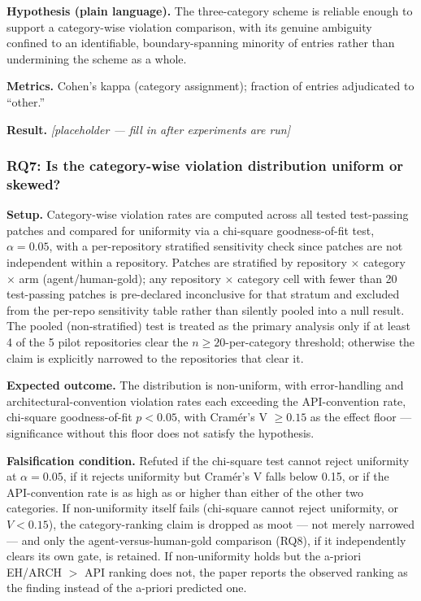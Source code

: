 \documentclass[11pt]{article}
\newcommand{\ph}{\textit{[placeholder --- fill in after experiments are run]}}
\begin{document}
\textbf{Hypothesis (plain language).} The three-category scheme is reliable enough to support a category-wise violation comparison, with its genuine ambiguity confined to an identifiable, boundary-spanning minority of entries rather than undermining the scheme as a whole.

\textbf{Metrics.} Cohen's kappa (category assignment); fraction of entries adjudicated to ``other.''

\textbf{Result.} \ph

\subsubsection{RQ7: Is the category-wise violation distribution uniform or skewed?}
\textbf{Setup.} Category-wise violation rates are computed across all tested test-passing patches and compared for uniformity via a chi-square goodness-of-fit test, $\alpha = 0.05$, with a per-repository stratified sensitivity check since patches are not independent within a repository. Patches are stratified by repository $\times$ category $\times$ arm (agent/human-gold); any repository $\times$ category cell with fewer than 20 test-passing patches is pre-declared inconclusive for that stratum and excluded from the per-repo sensitivity table rather than silently pooled into a null result. The pooled (non-stratified) test is treated as the primary analysis only if at least 4 of the 5 pilot repositories clear the $n \geq 20$-per-category threshold; otherwise the claim is explicitly narrowed to the repositories that clear it.

\textbf{Expected outcome.} The distribution is non-uniform, with error-handling and architectural-convention violation rates each exceeding the API-convention rate, chi-square goodness-of-fit $p < 0.05$, with Cram\'er's V $\geq 0.15$ as the effect floor --- significance without this floor does not satisfy the hypothesis.

\textbf{Falsification condition.} Refuted if the chi-square test cannot reject uniformity at $\alpha = 0.05$, if it rejects uniformity but Cram\'er's V falls below 0.15, or if the API-convention rate is as high as or higher than either of the other two categories. If non-uniformity itself fails (chi-square cannot reject uniformity, or $V < 0.15$), the category-ranking claim is dropped as moot --- not merely narrowed --- and only the agent-versus-human-gold comparison (RQ8), if it independently clears its own gate, is retained. If non-uniformity holds but the a-priori EH/ARCH $>$ API ranking does not, the paper reports the observed ranking as the finding instead of the a-priori predicted one.
\end{document}
